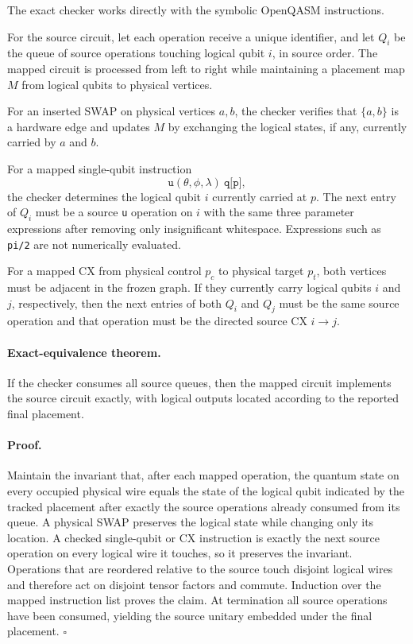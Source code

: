 \documentclass[11pt]{article}
\begin{document}
The exact checker works directly with the symbolic OpenQASM instructions.

For the source circuit, let each operation receive a unique identifier, and
let \(Q_i\) be the queue of source operations touching logical qubit \(i\), in
source order.  The mapped circuit is processed from left to right while
maintaining a placement map \(M\) from logical qubits to physical vertices.

For an inserted SWAP on physical vertices \(a,b\), the checker verifies that
\(\{a,b\}\) is a hardware edge and updates \(M\) by exchanging the logical
states, if any, currently carried by \(a\) and \(b\).

For a mapped single-qubit instruction
\[
  \texttt{u}(\theta,\phi,\lambda)\ \texttt{q[p]},
\]
the checker determines the logical qubit \(i\) currently carried at \(p\).
The next entry of \(Q_i\) must be a source \texttt{u} operation on \(i\) with
the same three parameter expressions after removing only insignificant
whitespace.  Expressions such as \texttt{pi/2} are not numerically evaluated.

For a mapped CX from physical control \(p_c\) to physical target \(p_t\), both
vertices must be adjacent in the frozen graph.  If they currently carry
logical qubits \(i\) and \(j\), respectively, then the next entries of both
\(Q_i\) and \(Q_j\) must be the same source operation and that operation must
be the directed source CX \(i\to j\).

\paragraph{Exact-equivalence theorem.}
If the checker consumes all source queues, then the mapped circuit implements
the source circuit exactly, with logical outputs located according to the
reported final placement.

\paragraph{Proof.}
Maintain the invariant that, after each mapped operation, the quantum state on
every occupied physical wire equals the state of the logical qubit indicated
by the tracked placement after exactly the source operations already consumed
from its queue.  A physical SWAP preserves the logical state while changing
only its location.  A checked single-qubit or CX instruction is exactly the
next source operation on every logical wire it touches, so it preserves the
invariant.  Operations that are reordered relative to the source touch
disjoint logical wires and therefore act on disjoint tensor factors and
commute.  Induction over the mapped instruction list proves the claim.  At
termination all source operations have been consumed, yielding the source
unitary embedded under the final placement. \(\square\)
\end{document}
